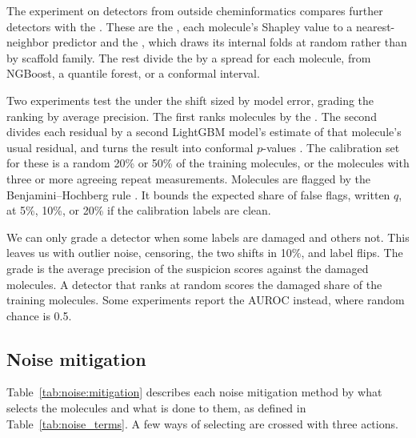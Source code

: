 The experiment on detectors from outside cheminformatics compares further detectors with the . These are the , each molecule's Shapley value to a nearest-neighbor predictor \citep{ghorbani2019data, jia2019efficient} and the  \citep{zhou2024detecting}, which draws its internal folds at random rather than by scaffold family. The rest divide the  by a spread for each molecule, from NGBoost, a quantile forest, or a conformal interval.

Two experiments test the  under the shift sized by model error, grading the ranking by average precision. The first ranks molecules by the . The second divides each residual by a second LightGBM model's estimate of that molecule's usual residual, and turns the result into conformal $p$-values \citep{bates2023testing}. The calibration set for these is a random 20\% or 50\% of the training molecules, or the molecules with three or more agreeing repeat measurements. Molecules are flagged by the Benjamini--Hochberg rule \citep{benjamini1995controlling}. It bounds the expected share of false flags, written $q$, at 5\%, 10\%, or 20\% if the calibration labels are clean.

We can only grade a detector when some labels are damaged and others not. This leaves us with outlier noise, censoring, the two shifts in 10\%, and label flips. The grade is the average precision of the suspicion scores against the damaged molecules. A detector that ranks at random scores the damaged share of the training molecules. Some experiments report the AUROC instead, where random chance is 0.5.

\subsection{Noise mitigation}\label{sec:noise:mitigation}

Table~\ref{tab:noise:mitigation} describes each noise mitigation method by what selects the molecules and what is done to them, as defined in Table~\ref{tab:noise_terms}. A few ways of selecting are crossed with three actions.


